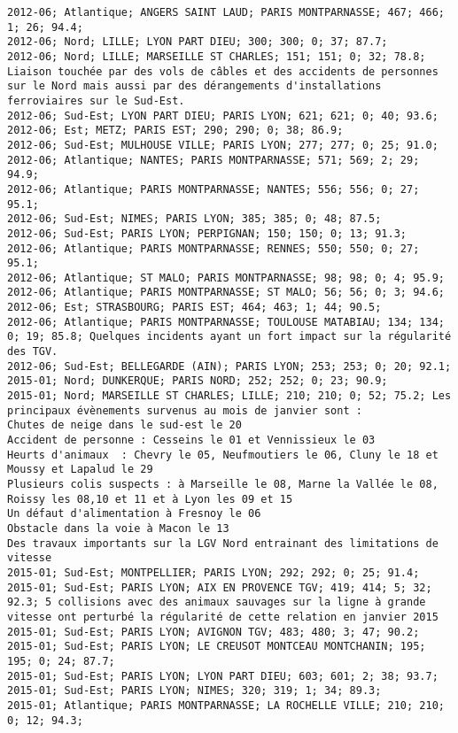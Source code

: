 \documentclass{article}
\begin{document}
\begin{Verbatim}[commandchars=\\\{\}]
2012-06; Atlantique; ANGERS SAINT LAUD; PARIS MONTPARNASSE; 467; 466; 1; 26; 94.4; 
2012-06; Nord; LILLE; LYON PART DIEU; 300; 300; 0; 37; 87.7; 
2012-06; Nord; LILLE; MARSEILLE ST CHARLES; 151; 151; 0; 32; 78.8; Liaison touchée par des vols de câbles et des accidents de personnes sur le Nord mais aussi par des dérangements d'installations ferroviaires sur le Sud-Est.
2012-06; Sud-Est; LYON PART DIEU; PARIS LYON; 621; 621; 0; 40; 93.6; 
2012-06; Est; METZ; PARIS EST; 290; 290; 0; 38; 86.9; 
2012-06; Sud-Est; MULHOUSE VILLE; PARIS LYON; 277; 277; 0; 25; 91.0; 
2012-06; Atlantique; NANTES; PARIS MONTPARNASSE; 571; 569; 2; 29; 94.9; 
2012-06; Atlantique; PARIS MONTPARNASSE; NANTES; 556; 556; 0; 27; 95.1; 
2012-06; Sud-Est; NIMES; PARIS LYON; 385; 385; 0; 48; 87.5; 
2012-06; Sud-Est; PARIS LYON; PERPIGNAN; 150; 150; 0; 13; 91.3; 
2012-06; Atlantique; PARIS MONTPARNASSE; RENNES; 550; 550; 0; 27; 95.1; 
2012-06; Atlantique; ST MALO; PARIS MONTPARNASSE; 98; 98; 0; 4; 95.9; 
2012-06; Atlantique; PARIS MONTPARNASSE; ST MALO; 56; 56; 0; 3; 94.6; 
2012-06; Est; STRASBOURG; PARIS EST; 464; 463; 1; 44; 90.5; 
2012-06; Atlantique; PARIS MONTPARNASSE; TOULOUSE MATABIAU; 134; 134; 0; 19; 85.8; Quelques incidents ayant un fort impact sur la régularité des TGV.
2012-06; Sud-Est; BELLEGARDE (AIN); PARIS LYON; 253; 253; 0; 20; 92.1; 
2015-01; Nord; DUNKERQUE; PARIS NORD; 252; 252; 0; 23; 90.9; 
2015-01; Nord; MARSEILLE ST CHARLES; LILLE; 210; 210; 0; 52; 75.2; Les principaux évènements survenus au mois de janvier sont :
Chutes de neige dans le sud-est le 20 
Accident de personne : Cesseins le 01 et Vennissieux le 03
Heurts d'animaux  : Chevry le 05, Neufmoutiers le 06, Cluny le 18 et Moussy et Lapalud le 29
Plusieurs colis suspects : à Marseille le 08, Marne la Vallée le 08, Roissy les 08,10 et 11 et à Lyon les 09 et 15
Un défaut d'alimentation à Fresnoy le 06
Obstacle dans la voie à Macon le 13
Des travaux importants sur la LGV Nord entrainant des limitations de vitesse
2015-01; Sud-Est; MONTPELLIER; PARIS LYON; 292; 292; 0; 25; 91.4; 
2015-01; Sud-Est; PARIS LYON; AIX EN PROVENCE TGV; 419; 414; 5; 32; 92.3; 5 collisions avec des animaux sauvages sur la ligne à grande vitesse ont perturbé la régularité de cette relation en janvier 2015
2015-01; Sud-Est; PARIS LYON; AVIGNON TGV; 483; 480; 3; 47; 90.2; 
2015-01; Sud-Est; PARIS LYON; LE CREUSOT MONTCEAU MONTCHANIN; 195; 195; 0; 24; 87.7; 
2015-01; Sud-Est; PARIS LYON; LYON PART DIEU; 603; 601; 2; 38; 93.7; 
2015-01; Sud-Est; PARIS LYON; NIMES; 320; 319; 1; 34; 89.3; 
2015-01; Atlantique; PARIS MONTPARNASSE; LA ROCHELLE VILLE; 210; 210; 0; 12; 94.3; 

\end{Verbatim}
\end{document}

